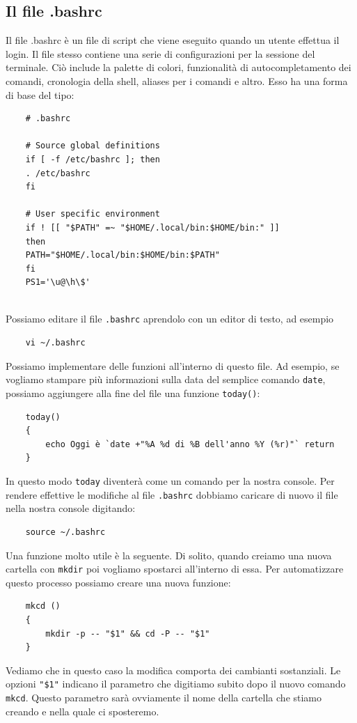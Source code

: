 \subsection{Il file .bashrc}
Il file .bashrc è un file di script che viene eseguito quando un utente effettua il login. Il file stesso contiene una serie di configurazioni per la sessione del terminale. Ciò include la palette di colori, funzionalità di autocompletamento dei comandi, cronologia della shell, aliases per i comandi e altro. Esso ha una forma di base del tipo:
\begin{verbatim}
	# .bashrc
	
	# Source global definitions
	if [ -f /etc/bashrc ]; then
	. /etc/bashrc
	fi
	
	# User specific environment
	if ! [[ "$PATH" =~ "$HOME/.local/bin:$HOME/bin:" ]]
	then
	PATH="$HOME/.local/bin:$HOME/bin:$PATH"
	fi
	PS1='\u@\h\$'
	
\end{verbatim}
Possiamo editare il file \verb*|.bashrc| aprendolo con un editor di testo, ad esempio
\begin{verbatim}
	vi ~/.bashrc
\end{verbatim}

Possiamo implementare delle funzioni all'interno di questo file. Ad esempio, se vogliamo stampare più informazioni sulla data del semplice comando \verb*|date|, possiamo aggiungere alla fine del file una funzione \verb*|today()|:
\begin{verbatim}
	today()
	{
		echo Oggi è `date +"%A %d di %B dell'anno %Y (%r)"` return
	}
\end{verbatim}
In questo modo \verb*|today| diventerà come un comando per la nostra console. Per rendere effettive le modifiche al file \verb*|.bashrc| dobbiamo caricare di nuovo il file nella nostra console digitando:
\begin{verbatim}
	source ~/.bashrc
\end{verbatim}
Una funzione molto utile è la seguente. Di solito, quando creiamo una nuova cartella con \verb*|mkdir| poi vogliamo spostarci all'interno di essa. Per automatizzare questo processo possiamo creare una nuova funzione:
\begin{verbatim}
	mkcd ()
	{
		mkdir -p -- "$1" && cd -P -- "$1"
	}
\end{verbatim}
Vediamo che in questo caso la modifica comporta dei cambianti sostanziali. Le opzioni \verb*|"$1"| indicano il parametro che digitiamo subito dopo il nuovo comando \verb*|mkcd|. Questo parametro sarà ovviamente il nome della cartella che stiamo creando e nella quale ci sposteremo. 


